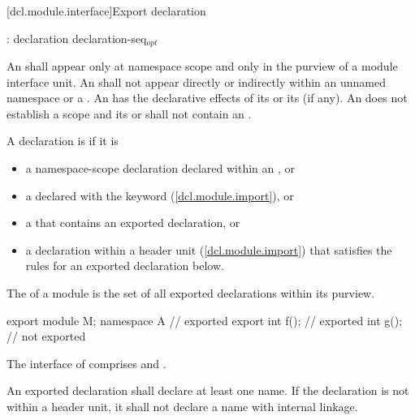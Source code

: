 [dcl.module.interface]{Export declaration}%

\begin{std.txt}\color{addclr}
  \begin{bnf}\color{addclr}
    :\br
       declaration\br 
       \terminal{\{} declaration-seq${}_{opt}$ \terminal{\}} 
  \end{bnf}

  \resetalinea[0]
  \alinea 
  An  shall appear only
  at namespace scope and only in the purview of a module interface unit. 
  An  shall not appear directly
  or indirectly within an unnamed namespace
  or a .
  An 
  has the declarative effects of its 
  or its  (if any).
  An  does not
  establish a scope and its 
  or 
  shall not contain an .

  \alinea
  A declaration is  if it is
  \begin{itemize}\color{addclr}
  \item a namespace-scope declaration declared within an
        , or
  \item a  declared with
        the  keyword (\ref{dcl.module.import}), or
  \item a  that contains an
        exported declaration, or
  \item a declaration within a header unit (\ref{dcl.module.import})
        that satisfies the rules for an exported declaration below.
  \end{itemize}
  The  of a module  is the set of all
  exported declarations within its purview.
  \begin{example}
  \begin{codeblock}
  export module M;
  namespace A {         // exported
    export int f();     // exported
    int g();            // not exported
  }
  \end{codeblock}
  The interface of  comprises  and .
  \end{example}

  \alinea
  An exported declaration shall declare at least one name.
  If the declaration is not within a header unit,
  it shall not declare a name with internal linkage.


\end{std.txt}
